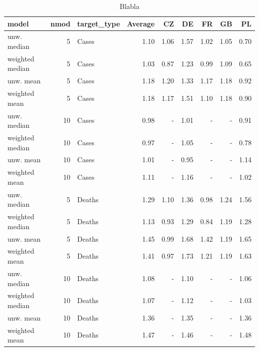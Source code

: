 \begin{table}[t]
\centering
\begin{tabular}{lrlrrrrrr}
\hline
model & nmod & target\_type & Average & CZ & DE & FR & GB & PL\\
\hline
unw. median & 5 & Cases & 1.10 & 1.06 & 1.57 & 1.02 & 1.05 & 0.70\\
weighted median & 5 & Cases & 1.03 & 0.87 & 1.23 & 0.99 & 1.09 & 0.65\\[0.4em]
unw. mean & 5 & Cases & 1.18 & 1.20 & 1.33 & 1.17 & 1.18 & 0.92\\
weighted mean & 5 & Cases & 1.18 & 1.17 & 1.51 & 1.10 & 1.18 & 0.90\\[0.4em]
unw. median & 10 & Cases & 0.98 & - & 1.01 & - & - & 0.91\\
weighted median & 10 & Cases & 0.97 & - & 1.05 & - & - & 0.78\\[0.4em]
unw. mean & 10 & Cases & 1.01 & - & 0.95 & - & - & 1.14\\
weighted mean & 10 & Cases & 1.11 & - & 1.16 & - & - & 1.02\\[0.4em]
unw. median & 5 & Deaths & 1.29 & 1.10 & 1.36 & 0.98 & 1.24 & 1.56\\
weighted median & 5 & Deaths & 1.13 & 0.93 & 1.29 & 0.84 & 1.19 & 1.28\\[0.4em]
unw. mean & 5 & Deaths & 1.45 & 0.99 & 1.68 & 1.42 & 1.19 & 1.65\\
weighted mean & 5 & Deaths & 1.41 & 0.97 & 1.73 & 1.21 & 1.19 & 1.63\\[0.4em]
unw. median & 10 & Deaths & 1.08 & - & 1.10 & - & - & 1.06\\
weighted median & 10 & Deaths & 1.07 & - & 1.12 & - & - & 1.03\\[0.4em]
unw. mean & 10 & Deaths & 1.36 & - & 1.35 & - & - & 1.36\\
weighted mean & 10 & Deaths & 1.47 & - & 1.46 & - & - & 1.48\\
\hline
\end{tabular}
\caption{Blabla}
\label{tab:rel_wis_best_performers}
\end{table}
